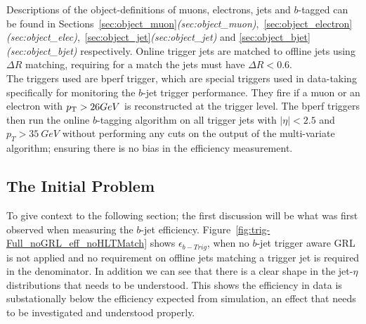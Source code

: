 Descriptions of the object-definitions of muons, electrons, jets and $b$-tagged can be found in
Sections~\ref{sec:object_muon}\textit{(sec:object\_muon)},~\ref{sec:object_electron}\textit{(sec:object\_elec)},~\ref{sec:object_jet}\textit{(sec:object\_jet)}
and \ref{sec:object_bjet}\textit{(sec:object\_bjet)} respectively.
Online trigger jets are matched to offline jets using $\Delta R$ matching, requiring for a match the jets must have $\Delta R<0.6$.\\

The triggers used are bperf trigger, which are special triggers used in data-taking specifically for monitoring the $b$-jet trigger performance.
They fire if a muon or an electron with $p_{\mathrm{T}} > 26 GeV$ is reconstructed at the trigger level.
The bperf triggers then run the online $b$-tagging algorithm on all trigger jets with $|\eta|<2.5$ and
$p_{T}>35~GeV$ without performing any cuts on the output of the multi-variate algorithm; ensuring there is no bias in the efficiency measurement. \\

\subsection{The Initial Problem}

To give context to the following section;
the first discussion will be what was first observed when measuring the $b$-jet efficiency.
Figure~\ref{fig:trig-Full_noGRL_eff_noHLTMatch} shows $\epsilon_{b-Trig}$,
when no $b$-jet trigger aware GRL is not applied
and no requirement on offline jets matching a trigger jet is required in the denominator.
In addition we can see that there is a clear shape in the jet-$\eta$ distributions that needs to be understood.
This shows the efficiency in data is substationally below the efficiency expected from simulation,
an effect that needs to be investigated and understood properly.

